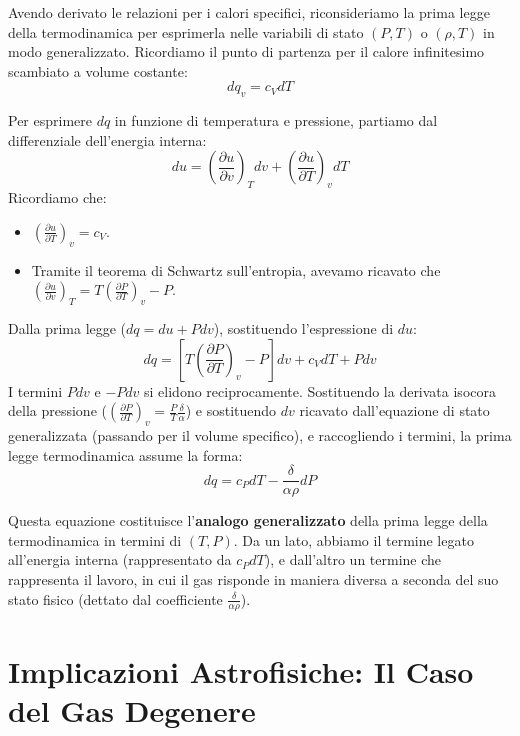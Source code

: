 Avendo derivato le relazioni per i calori specifici, riconsideriamo la prima legge della termodinamica per esprimerla nelle variabili di stato $(P, T)$ o $(\rho, T)$ in modo generalizzato.
Ricordiamo il punto di partenza per il calore infinitesimo scambiato a volume costante:
\begin{equation}
dq_v = c_V dT
\end{equation}

Per esprimere $dq$ in funzione di temperatura e pressione, partiamo dal differenziale dell'energia interna:
\begin{equation}
du = \left(\frac{\partial u}{\partial v}\right)_T dv + \left(\frac{\partial u}{\partial T}\right)_v dT
\end{equation}
Ricordiamo che:
\begin{itemize}
\item $\left(\frac{\partial u}{\partial T}\right)_v = c_V$.
\item Tramite il teorema di Schwartz sull'entropia, avevamo ricavato che $\left(\frac{\partial u}{\partial v}\right)_T = T \left(\frac{\partial P}{\partial T}\right)_v - P$.
\end{itemize}

Dalla prima legge ($dq = du + P dv$), sostituendo l'espressione di $du$:
\begin{equation}
dq = \left[ T \left(\frac{\partial P}{\partial T}\right)_v - P \right] dv + c_V dT + P dv
\end{equation}
I termini $P dv$ e $-P dv$ si elidono reciprocamente. Sostituendo la derivata isocora della pressione ($\left(\frac{\partial P}{\partial T}\right)_v = \frac{P}{T} \frac{\delta}{\alpha}$) e sostituendo $dv$ ricavato dall'equazione di stato generalizzata (passando per il volume specifico), e raccogliendo i termini, la prima legge termodinamica assume la forma:
\begin{equation}
dq = c_P dT - \frac{\delta}{\alpha \rho} dP
\end{equation}

Questa equazione costituisce l'\textbf{analogo generalizzato} della prima legge della termodinamica in termini di $(T, P)$. Da un lato, abbiamo il termine legato all'energia interna (rappresentato da $c_P dT$), e dall'altro un termine che rappresenta il lavoro, in cui il gas risponde in maniera diversa a seconda del suo stato fisico (dettato dal coefficiente $\frac{\delta}{\alpha \rho}$).

\section{Implicazioni Astrofisiche: Il Caso del Gas Degenere}

